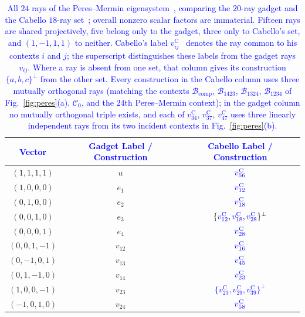\documentclass[%
  reprint,
  superscriptaddress,
  showkeys,
  amsmath,amssymb,
  aps,pra,
  longbibliography,
  floatfix,
  x11names
]{revtex4-2}
\DeclareRobustCommand{\chg}[1]{\textcolor{blue}{#1}}
\begin{document}
\begin{table}[ht]
\caption{\chg{All $24$ rays of the Peres--Mermin eigensystem~\cite{peres111,mermin90b,peres-91,pavicic-2004ksafq,svozil-2024-convert-pra-externalfigures,2024-cabello-trandafir0}, comparing the $20$-ray gadget and the Cabello $18$-ray set~\cite{cabello-96,cabello:210401}; overall nonzero scalar factors are immaterial.  Fifteen rays are shared projectively, five belong only to the gadget, three only to Cabello's set, and $(1,-1,1,1)$ to neither.  Cabello's label $v^{\mathrm{C}}_{ij}$~\cite{cabello:210401} denotes the ray common to his contexts $i$ and $j$; the superscript distinguishes these labels from the gadget rays $v_{ij}$.  Where a ray is absent from one set, that column gives its construction $\{a,b,c\}^\perp$ from the other set.  Every construction in the Cabello column uses three mutually orthogonal rays (matching the contexts $\mathcal{B}_{\mathrm{comp}}$, $\mathcal{B}_{1423}$, $\mathcal{B}_{1324}$, $\mathcal{B}_{1234}$ of Fig.~\ref{fig:peres}(a), $\mathcal{C}_0$, and the $24$th Peres--Mermin context); in the gadget column no mutually orthogonal triple exists, and each of $v^{\mathrm{C}}_{34}$, $v^{\mathrm{C}}_{37}$, $v^{\mathrm{C}}_{47}$ uses three linearly independent rays from its two incident contexts in Fig.~\ref{fig:peres}(b).}}
\label{tab:vector-equivalence}
\begin{ruledtabular}
\begin{tabular}{ccc}
\chg{Vector} & \chg{Gadget Label / Construction} & \chg{Cabello Label / Construction} \\
\hline
$(1,1,1,1)$ & $u$ & $\chg{v^{\mathrm{C}}_{56}}$ \\
$(1,0,0,0)$ & $e_1$ & $\chg{v^{\mathrm{C}}_{12}}$ \\
$(0,1,0,0)$ & $e_2$ & $\chg{v^{\mathrm{C}}_{18}}$ \\
$(0,0,1,0)$ & $e_3$ & $\{\chg{v^{\mathrm{C}}_{12}}, \chg{v^{\mathrm{C}}_{18}}, \chg{v^{\mathrm{C}}_{28}}\}^\perp$ \\
$(0,0,0,1)$ & $e_4$ & $\chg{v^{\mathrm{C}}_{28}}$ \\
\hline
$(0,0,1,-1)$ & $v_{12}$ & $\chg{v^{\mathrm{C}}_{16}}$ \\
$(0,-1,0,1)$ & $v_{13}$ & $\chg{v^{\mathrm{C}}_{45}}$ \\
$(0,1,-1,0)$ & $v_{14}$ & $\chg{v^{\mathrm{C}}_{23}}$ \\
$(1,0,0,-1)$ & $v_{23}$ & \chg{$\{v^{\mathrm{C}}_{23}, v^{\mathrm{C}}_{29}, v^{\mathrm{C}}_{39}\}^\perp$} \\
$(-1,0,1,0)$ & $v_{24}$ & $\chg{v^{\mathrm{C}}_{58}}$ \\

\end{tabular}
\end{ruledtabular}
\end{table}
\end{document}
